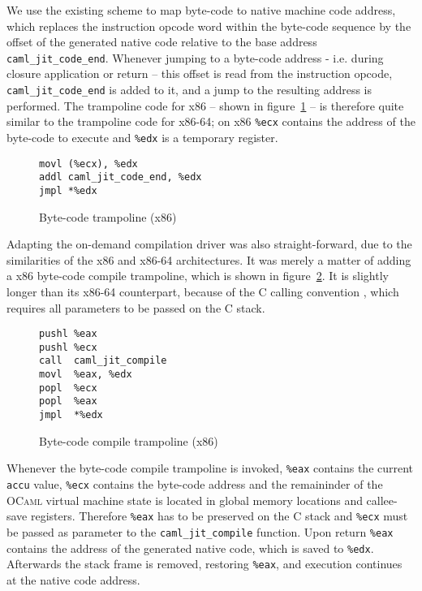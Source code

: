\documentclass[12pt,a4paper,final]{article}
\begin{document}
We use the existing scheme to map byte-code to native machine code address, which
replaces the instruction opcode word within the byte-code sequence by
the offset of the generated native code relative to the base address
\texttt{caml\_jit\_code\_end}. Whenever jumping to a byte-code address - i.e.
during closure application or return -- this offset is read from the instruction
opcode, \texttt{caml\_jit\_code\_end} is added to it, and a jump to the resulting
address is performed. The trampoline code for x86 -- shown in
figure~\ref{figure:Byte_code_trampoline_x86} -- is therefore quite similar to
the trampoline code for x86-64; on x86 \texttt{\%ecx} contains the address of the
byte-code to execute and \texttt{\%edx} is a temporary register.

\begin{figure}[h]
  \centering
  \begin{varwidth}{\linewidth}
  \begin{verbatim}
movl (%ecx), %edx
addl caml_jit_code_end, %edx
jmpl *%edx
\end{verbatim}
  \end{varwidth}
  \caption{Byte-code trampoline (x86)}
  \label{figure:Byte_code_trampoline_x86}
\end{figure}

Adapting the on-demand compilation driver was also straight-forward, due to
the similarities of the x86 and x86-64 architectures. It was merely a matter
of adding a x86 byte-code compile trampoline, which is shown in
figure~\ref{figure:Byte_code_compile_trampoline_x86}. It is slightly longer
than its x86-64 counterpart, because of the C calling convention \cite{SCO97Abi386},
which requires all parameters to be passed on the C stack.

\begin{figure}[h]
  \centering
  \begin{varwidth}{\linewidth}
  \begin{verbatim}
pushl %eax
pushl %ecx
call  caml_jit_compile
movl  %eax, %edx
popl  %ecx
popl  %eax
jmpl  *%edx
\end{verbatim}
  \end{varwidth}
  \caption{Byte-code compile trampoline (x86)}
  \label{figure:Byte_code_compile_trampoline_x86}
\end{figure}

Whenever the byte-code compile trampoline is invoked, \texttt{\%eax} contains
the current \texttt{accu} value, \texttt{\%ecx} contains the byte-code address
and the remaininder of the \textsc{OCaml} virtual machine state is located in
global memory locations and callee-save registers. Therefore \texttt{\%eax}
has to be preserved on the C stack and \texttt{\%ecx} must be passed as parameter
to the \texttt{caml\_jit\_compile} function. Upon return \texttt{\%eax} contains
the address of the generated native code, which is saved to \texttt{\%edx}.
Afterwards the stack frame is removed, restoring \texttt{\%eax}, and execution
continues at the native code address.
\end{document}
